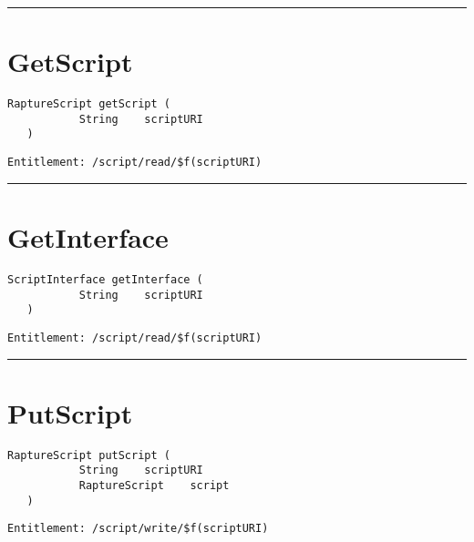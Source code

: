 \rule{12cm}{2pt}
\section{GetScript}
\label{Api:GetScript}
\begin{lstlisting}[style=nonumbers]
   RaptureScript getScript (
           String    scriptURI
   )
\end{lstlisting}
\begin{Verbatim}[formatcom=\color{Maroon}]
  Entitlement: /script/read/$f(scriptURI)
\end{Verbatim}



\rule{12cm}{2pt}
\section{GetInterface}
\label{Api:GetInterface}
\begin{lstlisting}[style=nonumbers]
   ScriptInterface getInterface (
           String    scriptURI
   )
\end{lstlisting}
\begin{Verbatim}[formatcom=\color{Maroon}]
  Entitlement: /script/read/$f(scriptURI)
\end{Verbatim}



\rule{12cm}{2pt}
\section{PutScript}
\label{Api:PutScript}
\begin{lstlisting}[style=nonumbers]
   RaptureScript putScript (
           String    scriptURI
           RaptureScript    script
   )
\end{lstlisting}
\begin{Verbatim}[formatcom=\color{Maroon}]
  Entitlement: /script/write/$f(scriptURI)
\end{Verbatim}



